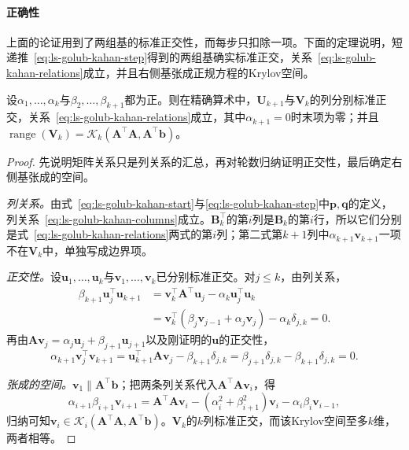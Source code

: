 \paragraph{正确性}
上面的论证用到了两组基的标准正交性，而每步只扣除一项。下面的定理说明，短递推~\eqref{eq:ls-golub-kahan-step}得到的两组基确实标准正交，关系~\eqref{eq:ls-golub-kahan-relations}成立，并且右侧基张成正规方程的Krylov空间。

\begin{theorem}
\label{thm:ls-golub-kahan-relations}
设$\alpha_1,\ldots,\alpha_k$与$\beta_2,\ldots,\beta_{k+1}$都为正。则在精确算术中，$\bm U_{k+1}$与$\bm V_k$的列分别标准正交，关系~\eqref{eq:ls-golub-kahan-relations}成立，其中$\alpha_{k+1}=0$时末项为零；并且$\operatorname{range}(\bm V_k)=\mathcal K_k(\bm A^\top\bm A,\bm A^\top\bm b)$。
\end{theorem}

\begin{proof}
先说明矩阵关系只是列关系的汇总，再对轮数归纳证明正交性，最后确定右侧基张成的空间。

\emph{列关系。}由式~\eqref{eq:ls-golub-kahan-start}与\eqref{eq:ls-golub-kahan-step}中$\bm p,\bm q$的定义，列关系~\eqref{eq:ls-golub-kahan-columns}成立。$\bm B_k^\top$的第$i$列是$\bm B_k$的第$i$行，所以它们分别是式~\eqref{eq:ls-golub-kahan-relations}两式的第$i$列；第二式第$k+1$列中$\alpha_{k+1}\bm v_{k+1}$一项不在$\bm V_k$中，单独写成边界项。

\emph{正交性。}设$\bm u_1,\ldots,\bm u_k$与$\bm v_1,\ldots,\bm v_k$已分别标准正交。对$j\le k$，由列关系，
\[
 \begin{aligned}
 \beta_{k+1}\bm u_j^\top\bm u_{k+1}
 &=\bm v_k^\top\bm A^\top\bm u_j-\alpha_k\bm u_j^\top\bm u_k\\
 &=\bm v_k^\top(\beta_j\bm v_{j-1}+\alpha_j\bm v_j)-\alpha_k\delta_{j,k}=0 .
 \end{aligned}
\]
再由$\bm A\bm v_j=\alpha_j\bm u_j+\beta_{j+1}\bm u_{j+1}$以及刚证明的$\bm u$的正交性，
\[
 \alpha_{k+1}\bm v_j^\top\bm v_{k+1}=\bm u_{k+1}^\top\bm A\bm v_j-\beta_{k+1}\delta_{j,k}=\beta_{j+1}\delta_{j,k}-\beta_{k+1}\delta_{j,k}=0 .
\]

\emph{张成的空间。}$\bm v_1\parallel\bm A^\top\bm b$；把两条列关系代入$\bm A^\top\bm A\bm v_i$，得
\[
 \alpha_{i+1}\beta_{i+1}\bm v_{i+1}=\bm A^\top\bm A\bm v_i-(\alpha_i^2+\beta_{i+1}^2)\bm v_i-\alpha_i\beta_i\bm v_{i-1},
\]
归纳可知$\bm v_i\in\mathcal K_i(\bm A^\top\bm A,\bm A^\top\bm b)$。$\bm V_k$的$k$列标准正交，而该Krylov空间至多$k$维，两者相等。
\end{proof}


